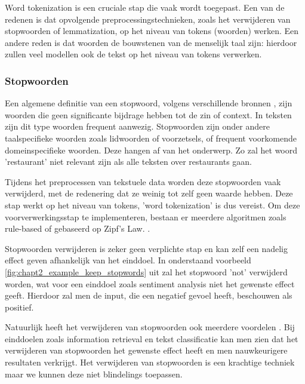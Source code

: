 
Word tokenization is een cruciale stap die vaak wordt toegepast. Een van de redenen is dat opvolgende preprocessingstechnieken, zoals het verwijderen van stopwoorden of lemmatization, op het niveau van tokens (woorden) werken. Een andere reden is dat woorden de bouwstenen van de menselijk taal zijn: hierdoor zullen veel modellen ook de tekst op het niveau van tokens verwerken.

\subsubsection{Stopwoorden}
Een algemene definitie van een stopwoord, volgens verschillende bronnen \cite{paper_stopwords,wisdom_stopwords,medium_stopwords,opinosis_stopwords}, zijn woorden die geen significante bijdrage hebben tot de zin of context. In teksten zijn dit type woorden frequent aanwezig. Stopwoorden zijn onder andere taalspecifieke woorden zoals lidwoorden of voorzetsels, of frequent voorkomende domeinspecifieke woorden. Deze hangen af van het onderwerp. Zo zal het woord 'restaurant' niet relevant zijn als alle teksten over restaurants gaan.

Tijdens het preprocessen van tekstuele data worden deze stopwoorden vaak verwijderd, met de redenering dat ze weinig tot zelf geen waarde hebben. Deze stap werkt op het niveau van tokens, 'word tokenization' is dus vereist. Om deze voorverwerkingsstap te implementeren, bestaan er meerdere algoritmen zoals rule-based of gebaseerd op Zipf’s Law. \cite{paper_stopwords}.

Stopwoorden verwijderen is zeker geen verplichte stap en kan zelf een nadelig effect geven afhankelijk van het einddoel. In onderstaand voorbeeld \ref{fig:chapt2_example_keep_stopwords} uit \cite{medium_stopwords} zal het stopwoord 'not' verwijderd worden, wat voor een einddoel zoals sentiment analysis niet het gewenste effect geeft. Hierdoor zal men de input, die een negatief gevoel heeft, beschouwen als positief.


Natuurlijk heeft het verwijderen van stopwoorden ook meerdere voordelen \cite{paper_stopwords}. Bij einddoelen zoals information retrieval en tekst classificatie kan men zien dat het verwijderen van stopwoorden het gewenste effect heeft en men nauwkeurigere resultaten verkrijgt. Het verwijderen van stopwoorden is een krachtige techniek maar we kunnen deze niet blindelings toepassen.

